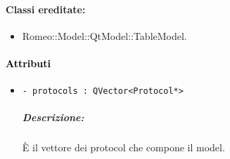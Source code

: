 \paragraph{Classi ereditate:}
\begin{itemize}
	\item Romeo::Model::QtModel::TableModel.
\end{itemize}

\paragraph{\textcolor{black}{Attributi\\}}
	\begin{itemize}
		\item \color{teal}\verb!- protocols : QVector<Protocol*>!
		\color{black}
		\subparagraph{Descrizione:} È il vettore dei protocol\g{} che compone il model.
	\end{itemize}
	
